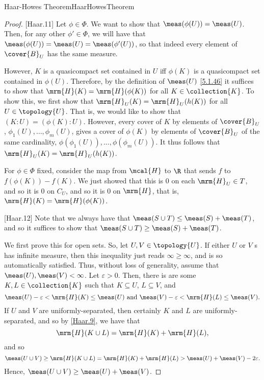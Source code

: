 \begin{thm}{Haar-Howes Theorem}{HaarHowesTheorem}
\begin{proof}
[Haar.11]
Let $\phi \in \Phi$.  We want to show that $\meas (\phi (U))=\meas (U)$.  Then, for any other $\phi '\in \Phi$, we will have that $\meas (\phi (U))=\meas (U)=\meas (\phi '(U))$, so that indeed every element of $\cover{B}_U$ has the same measure.

However, $K$ is a quasicompact set contained in $U$ iff $\phi (K)$ is a quasicompact set contained in $\phi (U)$.  Therefore, by the definition of $\meas (U)$ \eqref{5.1.46} it suffices to show that $\mrm{H}(K)=\mrm{H}(\phi (K))$ for all $K\in \collection{K}$.  To show this, we first show that $\mrm{H}_U(K)=\mrm{H}_U(h(K))$ for all $U\in \topology{U}$.  That is, we would like to show that $(K:U)=(\phi (K):U)$.  However, every cover of $K$ by elements of $\cover{B}_U$, $\phi _1(U),\ldots ,\phi _m(U)$, gives a cover of $\phi (K)$ by elements of $\cover{B}_U$ of the same cardinality, $\phi (\phi _1(U)),\ldots ,\phi (\phi _m(U))$.  It thus follows that $\mrm{H}_U(K)=\mrm{H}_U(h(K))$.

For $\phi \in \Phi$ fixed, consider the map from $\mcal{H}$ to $\R$ that sends $f$ to $f(\phi (K))-f(K)$.  We just showed that this is $0$ on each $\mrm{H}_U\in T$, and so it is $0$ on $C_U$, and so it is $0$ on $\mrm{H}$, that is, $\mrm{H}(K)=\mrm{H}(\phi (K))$.

[Haar.12]
Note that we always have that $\meas (S\cup T)\leq \meas (S)+\meas (T)$, and so it suffices to show that $\meas (S\cup T)\geq \meas (S)+\meas (T)$.

We first prove this for open sets.  So, let $U,V\in \topology{U}$.  If either $U$ or $V$ s has infinite measure, then this inequality just reads $\infty \geq \infty$, and is so automatically satisfied.  Thus, without loss of generality, assume that $\meas (U),\meas (V)<\infty$.  Let $\varepsilon >0$.  Then, there is are some $K,L\in \collection{K}$ such that $K\subseteq U$, $L\subseteq V$, and
\begin{equation}
\meas (U)-\varepsilon <\mrm{H}(K)\leq \meas (U)\text{ and }\meas (V)-\varepsilon <\mrm{H}(L)\leq \meas (V).
\end{equation}
If $U$ and $V$ are uniformly-separated, then certainly $K$ and $L$ are uniformly-separated, and so by \cref{Haar.9}, we have that
\begin{equation}
\mrm{H}(K\cup L)=\mrm{H}(K)+\mrm{H}(L),
\end{equation}
and so
\begin{equation}
\meas (U\cup V)\geq \mrm{H}(K\cup L)=\mrm{H}(K)+\mrm{H}(L)>\meas (U)+\meas (V)-2\varepsilon .
\end{equation}
Hence, $\meas (U\cup V)\geq \meas (U)+\meas (V)$.


\end{proof}
\end{thm}

